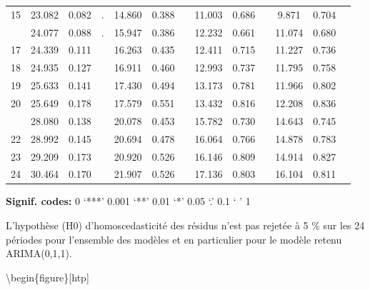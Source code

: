 \documentclass[]{article}
\begin{document}
\begin{table}[!h]
{\begin{threeparttable}
\begin{tabular}[t]{ccccccccccccc}
15 & 23.082 & 0.082 & . & 14.860 & 0.388 &  & 11.003 & 0.686 &  & 9.871 & 0.704 & \\
\addlinespace
16 & 24.077 & 0.088 & . & 15.947 & 0.386 &  & 12.232 & 0.661 &  & 11.074 & 0.680 & \\
17 & 24.339 & 0.111 &  & 16.263 & 0.435 &  & 12.411 & 0.715 &  & 11.227 & 0.736 & \\
18 & 24.935 & 0.127 &  & 16.911 & 0.460 &  & 12.993 & 0.737 &  & 11.795 & 0.758 & \\
19 & 25.633 & 0.141 &  & 17.430 & 0.494 &  & 13.173 & 0.781 &  & 11.966 & 0.802 & \\
20 & 25.649 & 0.178 &  & 17.579 & 0.551 &  & 13.432 & 0.816 &  & 12.208 & 0.836 & \\
\addlinespace
21 & 28.080 & 0.138 &  & 20.078 & 0.453 &  & 15.782 & 0.730 &  & 14.643 & 0.745 & \\
22 & 28.992 & 0.145 &  & 20.694 & 0.478 &  & 16.064 & 0.766 &  & 14.878 & 0.783 & \\
23 & 29.209 & 0.173 &  & 20.920 & 0.526 &  & 16.146 & 0.809 &  & 14.914 & 0.827 & \\
24 & 30.464 & 0.170 &  & 21.907 & 0.526 &  & 17.136 & 0.803 &  & 16.104 & 0.811 & \\
\bottomrule
\end{tabular}
\begin{tablenotes}
\item \hspace{-0.4cm}\textbf{Signif. codes: }0 `***' 0.001 `**' 0.01 `*' 0.05 `.' 0.1 ` ' 1
\item L’hypothèse (H0) d’homoscedasticité des résidus n’est pas rejetée à 5 \% sur les 24 périodes pour l’ensemble des modèles et en particulier pour le modèle retenu ARIMA(0,1,1).
\end{tablenotes}
\end{threeparttable}}
\end{table}

\textbackslash{}begin\{figure\}{[}htp{]}
\end{document}
